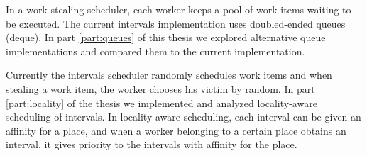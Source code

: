 
In a work-stealing scheduler, each worker keeps a pool of work items
waiting to be executed. The current intervals implementation uses
doubled-ended queues (deque). In part \ref{part:queues} of this thesis
we explored alternative queue implementations and compared them to the
current implementation.


Currently the intervals scheduler randomly schedules work items and
when stealing a work item, the worker chooses his victim by random. In
part \ref{part:locality} of the thesis we implemented and analyzed
locality-aware scheduling of intervals. In locality-aware scheduling,
each interval can be given an affinity for a place, and when a worker
belonging to a certain place obtains an interval, it gives priority to
the intervals with affinity for the place.

